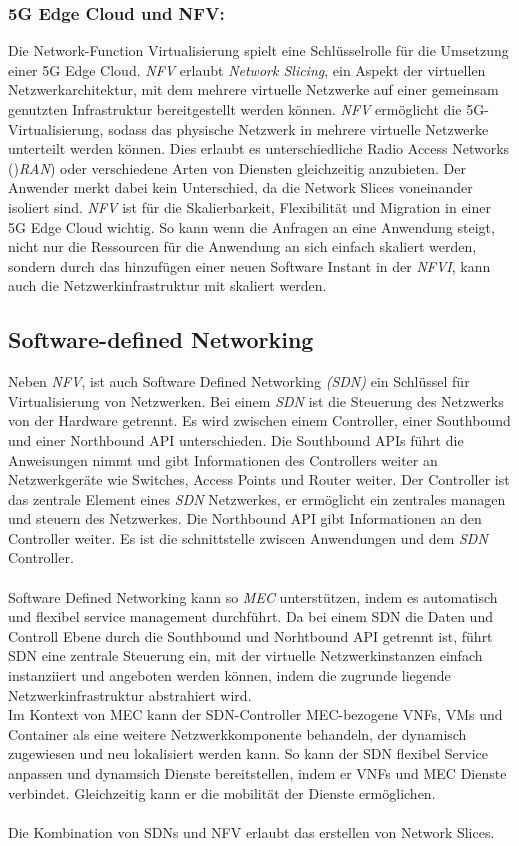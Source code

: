 \documentclass[runningheads]{llncs}
\numberwithin{figure}{section}
\begin{document}
\subsubsection{5G Edge Cloud und NFV:}
Die Network-Function Virtualisierung spielt eine Schlüsselrolle für die Umsetzung einer 5G Edge Cloud.
\textit{NFV} erlaubt \textit{Network Slicing}, ein Aspekt der virtuellen Netzwerkarchitektur, 
mit dem mehrere virtuelle Netzwerke auf einer gemeinsam genutzten Infrastruktur bereitgestellt werden können.
\textit{NFV} ermöglicht die 5G-Virtualisierung, sodass das physische Netzwerk in mehrere virtuelle Netzwerke unterteilt werden können. 
Dies erlaubt es unterschiedliche Radio Access Networks ()\textit{RAN}) 
oder verschiedene Arten von Diensten gleichzeitig anzubieten. Der Anwender merkt dabei kein Unterschied, da die Network Slices
voneinander isoliert sind. 
\textit{NFV} ist für die Skalierbarkeit, Flexibilität und Migration in einer 5G Edge Cloud wichtig. So kann wenn die Anfragen an eine
Anwendung steigt, nicht nur die Ressourcen für die Anwendung an sich einfach skaliert werden, sondern durch das hinzufügen einer neuen
Software Instant in der \textit{NFVI}, kann auch die Netzwerkinfrastruktur mit skaliert werden. \cite{How5GNFV}
\subsection{Software-defined Networking}
\label{subsec:Software-defined Networking}
Neben \textit{NFV}, ist auch Software Defined Networking \textit{(SDN)} ein Schlüssel für Virtualisierung von Netzwerken.
Bei einem \textit{SDN} ist die Steuerung des Netzwerks von der Hardware getrennt. Es wird zwischen einem Controller, einer Southbound und einer
Northbound API unterschieden. Die Southbound APIs führt die Anweisungen nimmt und gibt Informationen des Controllers weiter an Netzwerkgeräte wie Switches,
Access Points und Router weiter. Der Controller ist das zentrale Element eines \textit{SDN} Netzwerkes, er ermöglicht ein zentrales managen und steuern des 
Netzwerkes. Die Northbound API gibt Informationen an den Controller weiter. Es ist die schnittstelle zwiscen Anwendungen und dem \textit{SDN} Controller.\cite{SoftwareDefinedNetworkingSDN}
\\
\\
Software Defined Networking kann so \textit{MEC} unterstützen, indem es automatisch und flexibel service management durchführt.
Da bei einem SDN die Daten und Controll Ebene durch die Southbound und Norhtbound API getrennt ist, 
führt SDN eine zentrale Steuerung ein, 
mit der virtuelle Netzwerkinstanzen einfach instanziiert und angeboten werden können, 
indem die zugrunde liegende Netzwerkinfrastruktur abstrahiert wird. \\
Im Kontext von MEC kann der SDN-Controller MEC-bezogene VNFs, 
VMs und Container als eine weitere Netzwerkkomponente behandeln, der dynamisch zugewiesen und neu lokalisiert werden kann.
So kann der SDN flexibel Service anpassen und dynamsich Dienste bereitstellen, indem er VNFs und MEC Dienste verbindet.
Gleichzeitig kann er die mobilität der Dienste ermöglichen.
\\
\\
Die Kombination von SDNs und NFV erlaubt das erstellen von Network Slices. 
\end{document}
